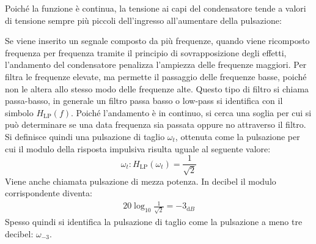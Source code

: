 \documentclass{article}
\newcommand{\df}{\mathrm{d}}
\numberwithin{equation}{subsection}
\begin{document}
Poiché la funzione è continua, la tensione ai capi del condensatore tende a valori di tensione sempre più piccoli dell'ingresso all'aumentare della pulsazione:

Se viene inserito un segnale composto da più frequenze, quando viene ricomposto frequenza per frequenza tramite il principio di sovrapposizione degli effetti, 
l'andamento del condensatore penalizza l'ampiezza delle frequenze maggiori. Per filtra le frequenze elevate, ma permette il passaggio delle frequenze basse, poiché 
non le altera allo stesso modo delle frequenze alte. 
Questo tipo di filtro si chiama passa-basso, in generale un filtro passa basso o low-pass si identifica con il simbolo $H_{\mathrm{LP}}(f)$. Poiché l'andamento è in continuo, 
si cerca una soglia per cui si può determinare se una data frequenza sia passata oppure no attraverso il filtro.
Si definisce quindi una pulsazione di taglio $\omega_t$, ottenuta come la pulsazione per cui il modulo della risposta impulsiva risulta uguale al seguente valore:
\begin{equation}
    \omega_t:H_{\mathrm{LP}}(\omega_t)=\displaystyle\frac{1}{\sqrt2}
\end{equation}
Viene anche chiamata pulsazione di mezza potenza. In decibel il modulo corrispondente diventa:
\begin{gather*}
    20\log_{10}\displaystyle\frac{1}{\sqrt2}=-3_{\df B}
\end{gather*}
Spesso quindi si identifica la pulsazione di taglio come la pulsazione a meno tre decibel: $\omega_{-3}$. 
\end{document}
